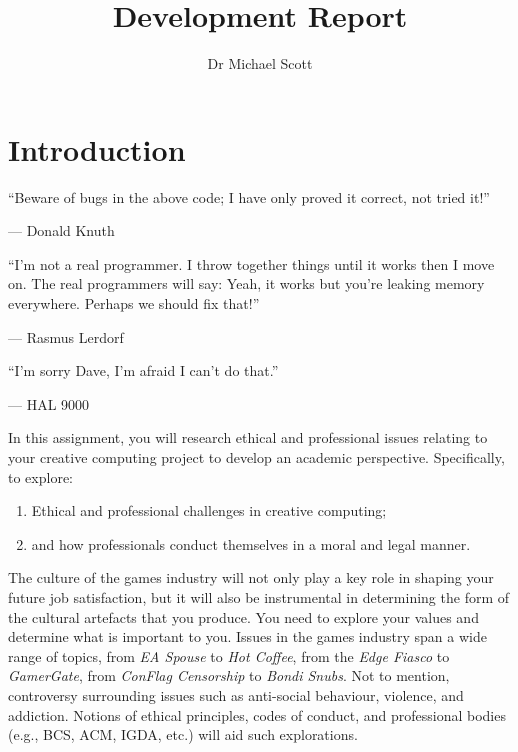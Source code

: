 \documentclass{../../fal_assignment}
\title{Development Report}
\author{Dr Michael Scott}
\begin{document}
\maketitle

\section*{Introduction}

\begin{marginquote}
  ``Beware of bugs in the above code; I have only proved it correct, not tried it!''
  
   --- Donald Knuth
   
    \marginquoterule
    
    ``I'm not a real programmer. I throw together things until it works then I move on. The real programmers will say: Yeah, it works but you're leaking memory everywhere. Perhaps we should fix that!''
    
    --- Rasmus Lerdorf
    
    \marginquoterule
    
    ``I'm sorry Dave, I'm afraid I can't do that.''
    
    --- HAL 9000
      
\end{marginquote}

In this assignment, you will research ethical and professional issues relating to your creative computing project to develop an academic perspective. Specifically, to explore: 

\begin{enumerate}[label=(\roman*)]
    \item Ethical and professional challenges in creative computing;
    \item and how professionals conduct themselves in a moral and legal manner.
\end{enumerate}

The culture of the games industry will not only play a key role in shaping your future job satisfaction, but it will also be instrumental in determining the form of the cultural artefacts that you produce. You need to explore your values and determine what is important to you. Issues in the games industry span a wide range of topics, from \textit{EA Spouse} to \textit{Hot Coffee}, from the \textit{Edge Fiasco} to \textit{GamerGate}, from \textit{ConFlag Censorship} to \textit{Bondi Snubs}. Not to mention, controversy surrounding issues such as anti-social behaviour, violence, and addiction. Notions of ethical principles, codes of conduct, and professional bodies (e.g., BCS, ACM, IGDA, etc.) will aid such explorations. 
\end{document}

